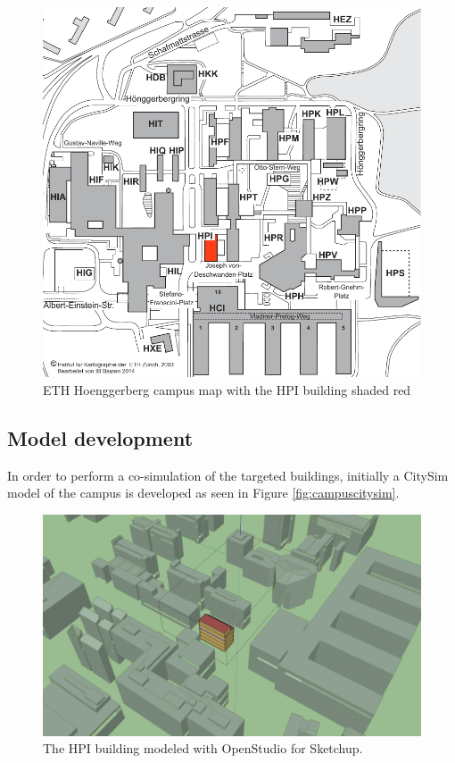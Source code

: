 \documentclass{tBPS2e}
\theoremstyle{plain}
\theoremstyle{definition}
\theoremstyle{remark}
\begin{document}
\begin{figure}[H]
\centering
\includegraphics[scale=0.5]{figures/ETH_Hoenngerbergcamp_targetedbuildings_HPI}
\caption{ETH Hoenggerberg campus map with the HPI building shaded red}
\label{fig:campusmap}
\end{figure}

\subsection{Model development}
In order to perform a co-simulation of the targeted buildings, initially a CitySim model of the campus is developed as seen in Figure \ref{fig:campuscitysim}. 

\begin{figure}[H]
\centering
\includegraphics[scale=0.2]{figures/HPI_Campus.png}
\caption{The HPI building modeled with OpenStudio for Sketchup.}
\label{fig:HPIcampus}
\end{figure}
\end{document}
